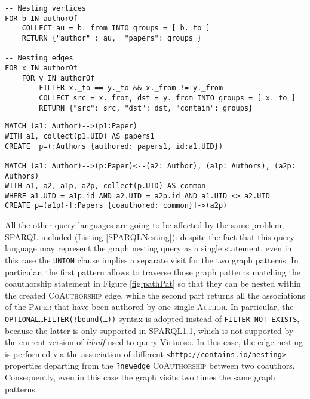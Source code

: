 \begin{lstfloat}[!p]
\begin{lstlisting}[caption={Graph Nesting in ArangoDB using AQL as a query lanugage. Please note that all the fields marked with an underscore represent externally indexed structures and. Therefore, only external indices are used within the query plan.},language=AQL,frameround=fttt,frame=trBL,tabsize=2,mathescape=true,label=AQLQueryNesting]
-- Nesting vertices
FOR b IN authorOf 
	COLLECT au = b._from INTO groups = [ b._to ] 
	RETURN {"author" : au,  "papers": groups }
	
-- Nesting edges
FOR x IN authorOf 
	FOR y IN authorOf 
		FILTER x._to == y._to && x._from != y._from 
		COLLECT src = x._from, dst = y._from INTO groups = [ x._to ] 
		RETURN {"src": src, "dst": dst, "contain": groups}
\end{lstlisting}
	
\begin{lstlisting}[caption={Graph Nesting in Neo4J using Cypher as a Query Language. Please note that, even in this case, is it not possible to return one single nested graph immediately, and hence the nested vertices must be created before creating the nested edges. This implies that a greater number of joins is required to associate the previously nested data to the original operand.},language=Cypher,frameround=fttt,frame=trBL,mathescape=true,label=Neo4JQuery]
MATCH (a1: Author)-->(p1:Paper) 
WITH a1, collect(p1.UID) AS papers1 
CREATE  p=(:Authors {authored: papers1, id:a1.UID})
	
MATCH (a1: Author)-->(p:Paper)<--(a2: Author), (a1p: Authors), (a2p: Authors)
WITH a1, a2, a1p, a2p, collect(p.UID) AS common
WHERE a1.UID = a1p.id AND a2.UID = a2p.id AND a1.UID <> a2.UID
CREATE p=(a1p)-[:Papers {coauthored: common}]->(a2p)
\end{lstlisting}
\end{lstfloat}


All the other query languages are going to be affected by the same problem, SPARQL included (Listing \ref{SPARQLNesting}): despite the fact that this query language may represent the graph nesting query as a single statement, even in this case the \texttt{UNION} clause implies a separate visit for the two graph patterns. In particular, the first pattern allows to traverse those graph patterns matching the coauthorship statement in Figure \vref{fig:pathPat} so that they can be nested within the created \textsc{CoAuthorship} edge, while the second part returns all the associations of the \textsc{Paper} that have been authored by one single \textsc{Author}. In particular, the \texttt{OPTIONAL\dots FILTER(!bound(\dots))} syntax is adopted instead of \texttt{FILTER NOT EXISTS}, because the latter is only supported in SPARQL1.1, which is not supported by the current version of \textit{librdf} used to query Virtuoso. In this case, the edge nesting is performed via the association of different \texttt{<http://contains.io/nesting>} properties departing from the \texttt{?newedge}  \textsc{CoAuthorship} between two coauthors. Consequently, even in this case the graph visits two times the same graph patterns.

